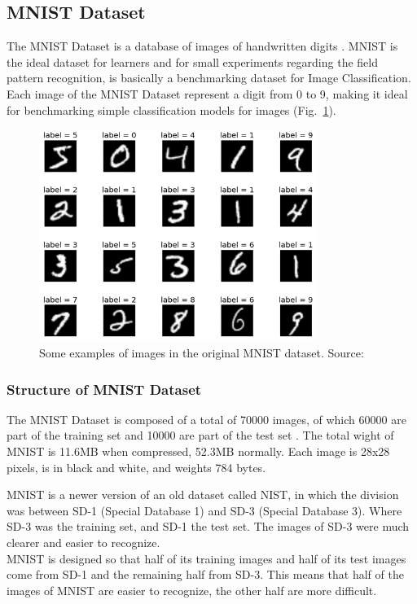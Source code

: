 \subsection{MNIST Dataset}

The MNIST Dataset is a database of images of handwritten digits \cite{MNIST}.
MNIST is the ideal dataset for learners and for small experiments regarding the field pattern recognition, is basically a benchmarking dataset for Image Classification.
\\[0.3cm]Each image of the MNIST Dataset represent a digit from 0 to 9, making it ideal for benchmarking simple classification models for images (Fig.~\ref{fig:figure-4.1.3}).
\begin{figure}[t]
	\centering
	\includegraphics[width=9cm]{figures/figure-4.1.3.png}
	\caption[Examples of MNIST Images]{Some examples of images in the original MNIST dataset. Source:~\cite{MNIST}}
	\label{fig:figure-4.1.3}
\end{figure}

\subsubsection{Structure of MNIST Dataset}

The MNIST Dataset is composed of a total of 70000 images, of which 60000 are part of the training set and 10000 are part of the test set \cite{MNIST}.
The total wight of MNIST is 11.6MB when compressed, 52.3MB normally. Each image is 28x28 pixels, is in black and white, and weights 784 bytes.

MNIST is a newer version of an old dataset called NIST, in which the division was between SD-1 (Special Database 1) and SD-3 (Special Database 3). Where SD-3 was the training set, and SD-1 the test set. The images of SD-3 were much clearer and easier to recognize.
\\[0.3cm]MNIST is designed so that half of its training images and half of its test images come from SD-1 and the remaining half from SD-3.
This means that half of the images of MNIST are easier to recognize, the other half are more difficult.

